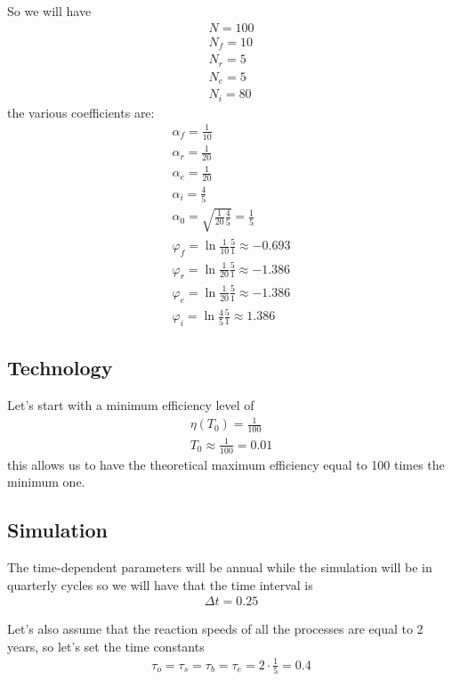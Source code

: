 \documentclass[a4paper,twoside]{article}
\begin{document}
So we will have
\begin{align*}
	N = 100
	\\
	N_f = 10
	\\
	N_r = 5	
	\\
	N_e = 5
	\\
	N_i = 80
\end{align*}
the various coefficients are:
\begin{align*}
	\alpha_f = \frac{1}{10}
	\\
	\alpha_r = \frac{1}{20}
	\\
	\alpha_e = \frac{1}{20}
	\\
	\alpha_i = \frac{4}{5}
	\\
	\alpha_0 = \sqrt{\frac{1}{20} \frac{4}{5}} = \frac{1}{5}
	\\
	\varphi_f = \ln \frac{1}{10} \frac{5}{1} \approx -0.693
	\\
	\varphi_r = \ln \frac{1}{20} \frac{5}{1} \approx -1.386
	\\
	\varphi_e = \ln \frac{1}{20} \frac{5}{1} \approx -1.386
	\\
	\varphi_i = \ln \frac{4}{5} \frac{5}{1} \approx 1.386
\end{align*}

\subsection{Technology}

Let's start with a minimum efficiency level of
\begin{align*}
	\eta(T_0) = \frac{1}{100}
	\\
	T_0 \approx \frac{1}{100} = 0.01
\end{align*}
this allows us to have the theoretical maximum efficiency equal to 100 times the minimum one.

\subsection{Simulation}

The time-dependent parameters will be annual while the simulation will be in quarterly cycles so we will have that the time interval is
\begin{align*}
	\Delta t = 0.25
\end{align*}

Let's also assume that the reaction speeds of all the processes are equal to 2 years, so let's set the time constants
\begin{align*}
	\tau_o = \tau_s = \tau_b = \tau_e = 2 \cdot \frac{1}{5} = 0.4
\end{align*}
\end{document}
